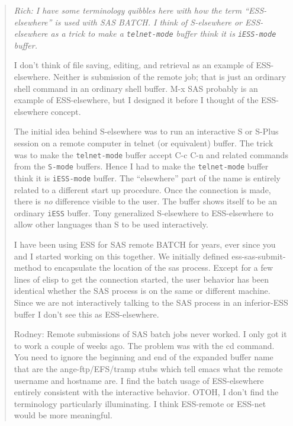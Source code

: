\documentclass{article}
\newcommand*{\SAS}{\textsc{SAS}}
\newcommand{\stexttt}[1]{{\small\texttt{#1}}}
\newenvironment{Comment}{\begin{quote}\small\itshape }{\end{quote}}
\begin{document}

\begin{Comment}
Rich: I have some terminology quibbles here with how the term
``ESS-elsewhere'' is used with SAS BATCH.  I think of S-elsewhere or
ESS-elsewhere as a trick to make a \stexttt{telnet-mode} buffer think
it is \stexttt{iESS-mode} buffer.

I don't think of file saving, editing, and retrieval as an example
of ESS-elsewhere.   Neither is submission of the remote job;
that is just an ordinary shell command in an ordinary shell buffer.
M-x SAS probably is an example of ESS-elsewhere, but I
designed it before I thought of the ESS-elsewhere concept.

The initial idea behind S-elsewhere was to run an interactive S or S-Plus
session on a remote computer in telnet (or equivalent) buffer.  The trick
was to make the \stexttt{telnet-mode} buffer accept C-c C-n and
related commands from the \stexttt{S-mode} buffers.  Hence I had to
make the \stexttt{telnet-mode} buffer think it is \stexttt{iESS-mode}
buffer.  The ``elsewhere'' part of the name is entirely related to a
different start up procedure.  Once the connection is made, there is
{\em no} difference visible to the user.  The buffer shows itself to
be an ordinary \stexttt{iESS} buffer.  Tony generalized S-elsewhere
to ESS-elsewhere to allow other languages than S to be used
interactively.

I have been using ESS for SAS remote BATCH for years, ever since you
and I started working on this together.  We initially defined
ess-sas-submit-method to encapsulate the location of the sas process.
Except for a few lines of elisp to get the connection started, the user
behavior has been identical whether the SAS process is on the same or
different machine.  Since we are not interactively talking to the SAS
process in an inferior-ESS buffer I don't see this as ESS-elsewhere.

Rodney: Remote submissions of SAS batch jobs never worked.  I only got
it to work a couple of weeks ago.  The problem was with the cd command.
You need to ignore the beginning and end of the expanded buffer name
that are the ange-ftp/EFS/tramp stubs which tell emacs what the remote
username and hostname are.  I find the batch usage of ESS-elsewhere
entirely consistent with the interactive behavior.  OTOH, I don't find 
the terminology particularly illuminating.  I think ESS-remote or 
ESS-net would be more meaningful. 
\end{Comment}
 
\end{document}
